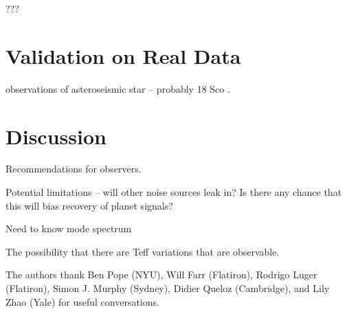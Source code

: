 \documentclass[modern]{aastex62}
\begin{document}
???

\section{Validation on Real Data}

\HARPS observations of asteroseismic star -- probably 18 Sco \citep{Bazot2012}.

\section{Discussion}

Recommendations for observers.

Potential limitations -- will other noise sources leak in? Is there any chance that this will bias recovery of planet signals?

Need to know mode spectrum

The possibility that there are Teff variations that are observable.

\acknowledgements

The authors thank
  Ben Pope (NYU),
  Will Farr (Flatiron),
  Rodrigo Luger (Flatiron),
  Simon J. Murphy (Sydney),
  Didier Queloz (Cambridge), and
  Lily Zhao (Yale)
for useful conversations.



\clearpage


\end{document}
